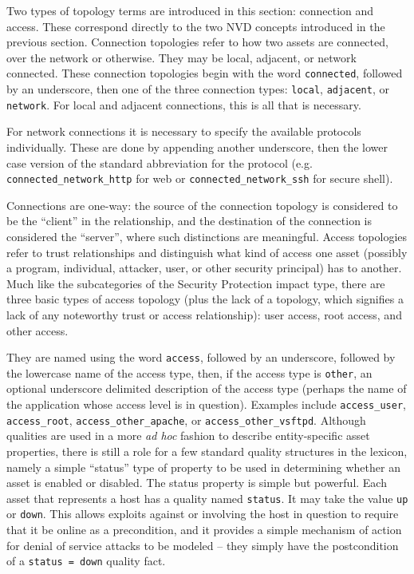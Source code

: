 Two types of topology terms are introduced in this section: connection and access. These
correspond directly to the two NVD concepts introduced in the previous section.
Connection topologies refer to how two assets are connected, over the network or otherwise.
They may be local, adjacent, or network connected. These connection topologies begin with
the word \texttt{connected}, followed by an underscore, then one of the three connection
types: \texttt{local}, \texttt{adjacent}, or \texttt{network}. For local and adjacent
connections, this is all that is necessary. 

For network connections it is
necessary to specify the available protocols individually. These are done by appending another
underscore, then the lower case version of the standard abbreviation for the protocol
(e.g. \texttt{connected\_network\_http} for web or \texttt{connected\_network\_ssh} for
secure shell).

Connections are one-way: the source of the connection topology is considered to be the
``client'' in the relationship, and the destination of the connection is considered
the ``server'', where such distinctions are meaningful.
Access topologies refer to trust relationships and distinguish what kind of access one
asset (possibly a program, individual, attacker, user, or other security principal) has
to another. Much like the subcategories of the Security Protection impact type,
there are three basic types of access topology (plus the lack of a topology, which
signifies a lack of any noteworthy trust or access relationship): user access,
root access, and other access.

They are named using the word \texttt{access}, followed by an underscore, followed
by the lowercase name of the access type, then, if the access type is \texttt{other},
an optional underscore delimited description of the access type (perhaps the name
of the application whose access level is in question). Examples include
\texttt{access\_user}, \texttt{access\_root}, \texttt{access\_other\_apache}, or
\texttt{access\_other\_vsftpd}.
Although qualities are used in a more \emph{ad hoc} fashion to describe entity-specific
asset properties, there is still a role for a few standard quality structures in the
lexicon, namely a simple ``status'' type of property to be used in determining
whether an asset is enabled or disabled.
The status property is simple but powerful. Each asset that represents a host has a
quality named \texttt{status}. It may take the value \texttt{up} or \texttt{down}.
This allows exploits against or involving the host in question to require that it
be online as a precondition, and it provides a simple mechanism of action for
denial of service attacks to be modeled -- they simply have the postcondition of
a \texttt{status = down} quality fact.

